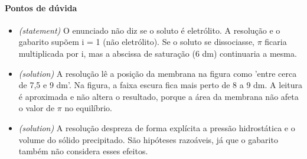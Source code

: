 \documentclass{article}%
\begin{document}
\paragraph{Pontos de dúvida}%
\begin{itemize}%
\item%
\textit{(statement)} O enunciado não diz se o soluto é eletrólito. A resolução e o gabarito supõem i = 1 (não eletrólito). Se o soluto se dissociasse, $\pi$ ficaria multiplicada por i, mas a abscissa de saturação (6 dm) continuaria a mesma.%
\item%
\textit{(solution)} A resolução lê a posição da membrana na figura como 'entre cerca de 7,5 e 9 dm'. Na figura, a faixa escura fica mais perto de 8 a 9 dm. A leitura é aproximada e não altera o resultado, porque a área da membrana não afeta o valor de $\pi$ no equilíbrio.%
\item%
\textit{(solution)} A resolução despreza de forma explícita a pressão hidrostática e o volume do sólido precipitado. São hipóteses razoáveis, já que o gabarito também não considera esses efeitos.%
\end{itemize}%
\end{document}
